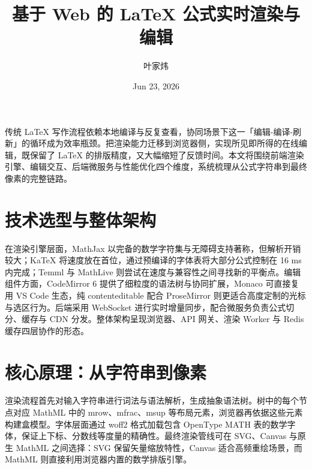 \title{基于 Web 的 LaTeX 公式实时渲染与编辑}
\author{叶家炜}
\date{Jun 23, 2026}
\maketitle
传统 LaTeX 写作流程依赖本地编译与反复查看，协同场景下这一「编辑-编译-刷新」的循环成为效率瓶颈。把渲染能力迁移到浏览器侧，实现所见即所得的在线编辑，既保留了 LaTeX 的排版精度，又大幅缩短了反馈时间。本文将围绕前端渲染引擎、编辑交互、后端微服务与性能优化四个维度，系统梳理从公式字符串到最终像素的完整链路。\par
\chapter{技术选型与整体架构}
在渲染引擎层面，MathJax 以完备的数学字符集与无障碍支持著称，但解析开销较大；KaTeX 将速度放在首位，通过预编译的字体表将大部分公式控制在 16 ms 内完成；Temml 与 MathLive 则尝试在速度与兼容性之间寻找新的平衡点。编辑组件方面，CodeMirror 6 提供了细粒度的语法树与协同扩展，Monaco 可直接复用 VS Code 生态，纯 contenteditable 配合 ProseMirror 则更适合高度定制的光标与选区行为。后端采用 WebSocket 进行实时增量同步，配合微服务负责公式切分、缓存与 CDN 分发。整体架构呈现浏览器、API 网关、渲染 Worker 与 Redis 缓存四层协作的形态。\par
\chapter{核心原理：从字符串到像素}
渲染流程首先对输入字符串进行词法与语法解析，生成抽象语法树。树中的每个节点对应 MathML 中的 mrow、mfrac、msup 等布局元素，浏览器再依据这些元素构建盒模型。字体层面通过 woff2 格式加载包含 OpenType MATH 表的数学字体，保证上下标、分数线等度量的精确性。最终渲染管线可在 SVG、Canvas 与原生 MathML 之间选择：SVG 保留矢量缩放特性，Canvas 适合高频重绘场景，而 MathML 则直接利用浏览器内置的数学排版引擎。\par
